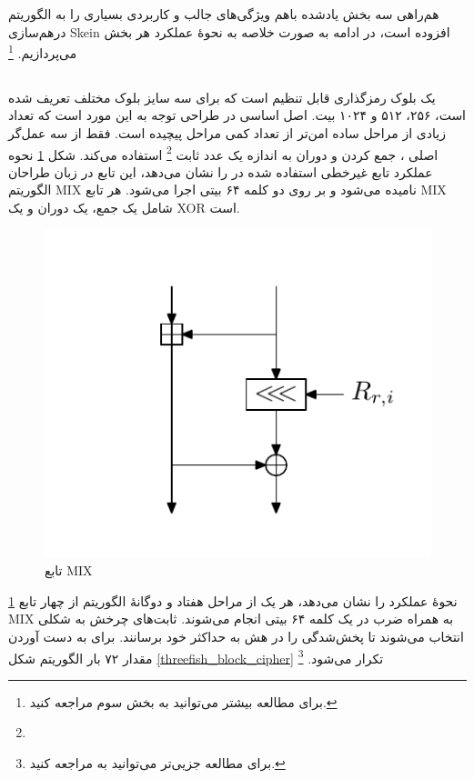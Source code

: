 هم‌راهی سه بخش یادشده باهم ویژگی‌های جالب و کاربردی بسیاری را به الگوریتم درهم‌سازی 
Skein 
افزوده است، در ادامه به صورت خلاصه به نحوهٔ عملکرد هر بخش می‌پردازیم.
\footnote{برای مطالعه بیشتر می‌توانید به بخش سوم 
	\cite{main_doc} مراجعه کنید. }


\subsection{}
یک بلوک رمزگذاری قابل تنظیم است که برای سه سایز بلوک مختلف تعریف شده است، ۲۵۶، ۵۱۲ و ۱۰۲۴ بیت. 
اصل اساسی در طراحی 
توجه به این مورد است که تعداد زیادی از مراحل ساده امن‌تر از تعداد کمی مراحل پیچیده است.
فقط از سه عمل‌گر اصلی 
، جمع کردن و دوران به اندازه یک عدد ثابت
\footnote{}
استفاده می‌کند. 
شکل 
\ref{threefish_mix_function}
نحوه عملکرد تابع غیرخطی استفاده شده در 
را نشان می‌دهد، این تابع در زبان طراحان الگوریتم 
MIX
نامیده می‌شود و بر روی دو کلمه ۶۴ بیتی اجرا می‌شود. هر تابع 
MIX
شامل یک جمع، یک دوران و یک 
XOR
است. 
\begin{figure}
	\centering
	\includegraphics[scale=0.7]{figs/threefish_mix_function.png}
	\caption{تابع MIX}
	\label{threefish_mix_function}
\end{figure}

\ref{threefish_mix_function}
نحوهٔ عملکرد 
را نشان می‌دهد، هر یک از مراحل هفتاد و دوگانهٔ الگوریتم
از چهار تابع MIX
به همراه ضرب در یک کلمه ۶۴ بیتی انجام می‌شوند. ثابت‌های چرخش به شکلی انتخاب می‌شوند تا پخش‌شدگی را در هش به حداکثر خود برسانند. 
برای به دست آوردن مقدار 
۷۲ بار الگوریتم شکل
\ref{threefish_block_cipher}
تکرار می‌شود.
\footnote{برای مطالعه جزیی‌تر می‌توانید به 
	\cite{main_doc}
مراجعه کنید.}

